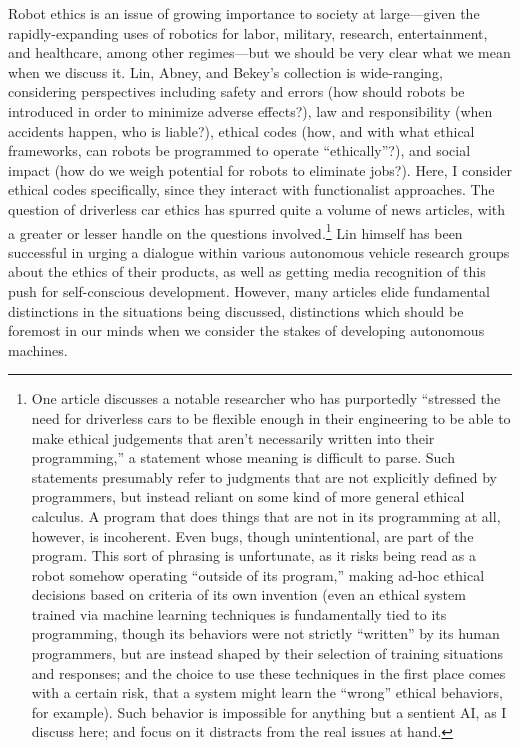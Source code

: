 Robot ethics is an issue of growing importance to society at
large---given the rapidly-expanding uses of robotics for labor, military,
research, entertainment, and healthcare, among other regimes\cite[p.
  5-6]{patrickLin}---but we should be very clear what we mean when we
discuss it. Lin, Abney, and Bekey's collection is wide-ranging,
considering perspectives including safety and errors (how should
robots be introduced in order to minimize adverse effects?), law and
responsibility (when accidents happen, who is liable?), ethical codes
(how, and with what ethical frameworks, can robots be programmed to
operate ``ethically''?), and social impact
(how do we weigh potential for robots to eliminate
jobs?).\cite{robotEthics} Here, I consider ethical codes specifically,
since they interact with functionalist approaches. The question of
driverless car ethics has spurred quite a volume of news articles,
with a greater or lesser handle on the questions
involved.\footnote{One article discusses a notable
  researcher who has purportedly ``stressed the need for driverless
  cars to be flexible enough in their 
engineering to be able to make ethical judgements that aren't
necessarily written into their programming,'' a statement whose
meaning is difficult to parse.\cite{jessicaDavies} Such statements presumably
refer to judgments that are not explicitly defined by programmers, but
instead reliant on some kind of more general ethical calculus. A
program that does things that are not in its programming at all,
however, is incoherent. Even bugs, though unintentional, are part of
the program. This sort of phrasing is unfortunate, as it
risks being read as a robot somehow operating ``outside of its
program,'' making ad-hoc ethical decisions based on criteria of its
own invention (even an ethical system trained via machine learning
techniques is fundamentally tied to its programming, though its
behaviors were not strictly ``written'' by its human programmers, but
are instead shaped by their selection of training situations and
responses; and the choice to use these techniques in the first place
comes with a certain risk, that a system
might learn the ``wrong'' ethical behaviors, for example). Such
behavior is impossible for anything but a sentient
AI, as I discuss here; and focus on it distracts from the real issues
at hand.} Lin himself has been successful in urging a dialogue
within various autonomous vehicle research groups about the ethics of
their products, as well as getting media recognition of this push for
self-conscious development.\cite{timeEthics} However, many articles
elide fundamental distinctions in the situations being discussed,
distinctions which should be foremost in our minds when we consider
the stakes of developing autonomous machines.


